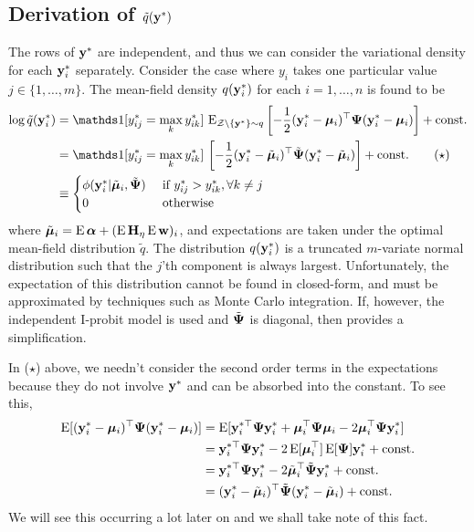 \subsection[Derivation of q ystar]{Derivation of $\tilde q({\mathbf y}^*)$}

The rows of ${\mathbf y}^*$ are independent, and thus we can consider the variational density for each ${\mathbf y}_i^*$ separately.
Consider the case where $y_i$ takes one particular value $j \in \{1,\dots,m\}$. The mean-field density $q({\mathbf y}_{i}^*)$ for each $i=1,\dots,n$ is found to be
\begin{align*}
  \log \tilde q(\by_{i}^*) 
  &=  \ind[y_{ij}^* = \max_k y_{ik}^*] \, \E_{\cZ\backslash\{\by^*\}\sim q} \left[ - \half (\by^*_i - \bmu_i)^\top \bPsi (\by^*_i - \bmu_i)  \right] + \const \\
  &= \ind[y_{ij}^* = \max_k y_{ik}^*] \, \left[ - \half (\by^*_i - \tilde\bmu_i)^\top \tilde\bPsi (\by^*_i - \tilde\bmu_i)  \right] + \const \tag{$\star$} \\
  &\equiv
  \begin{cases}
    \phi(\by_i^*|\tilde\bmu_i,\tilde\bPsi) & \text{ if } y_{ij}^* > y_{ik}^*, \forall k \neq j \\
    0 & \text{ otherwise} \\
  \end{cases}
\end{align*}
where $\tilde{{\bm\mu}}_i = \operatorname{E}{\bm\alpha} + (\operatorname{E}{\mathbf H}_\eta \operatorname{E}{\mathbf w})_i$, and expectations are taken under the optimal mean-field distribution $\tilde q$. 
The distribution $q({\mathbf y}_i^*)$ is a truncated $m$-variate normal distribution such that the $j$'th component is always largest. 
Unfortunately, the expectation of this distribution cannot be found in closed-form, and must be approximated by techniques such as Monte Carlo integration.
If, however, the independent I-probit model is used and $\tilde{{\bm\Psi}}$ is diagonal, then  provides a simplification.

\begin{remark}
  In ($\star$)  above,  we needn't consider the second order terms in the expectations because they do not involve ${\mathbf y}^*$ and can be absorbed into the constant.
  To see this,
  \begin{align*}
    \operatorname{E}[({\mathbf y}^*_i - {\bm\mu}_i)^\top{\bm\Psi}({\mathbf y}^*_i - {\bm\mu}_i)]
    &= \operatorname{E}[{\mathbf y}^{*\top}_i{\bm\Psi} {\mathbf y}^*_i + {\bm\mu}_i^\top{\bm\Psi}{\bm\mu}_i - 2{\bm\mu}_i^\top{\bm\Psi}{\mathbf y}^*_i] \\
    &= {\mathbf y}^{*\top}_i{\bm\Psi} {\mathbf y}^*_i - 2 \operatorname{E}[{\bm\mu}_i^\top] \operatorname{E}[{\bm\Psi}]{\mathbf y}^*_i + \text{const.}\hspace{0.01em} \\
    &= {\mathbf y}^{*\top}_i{\bm\Psi} {\mathbf y}^*_i - 2 \tilde{{\bm\mu}}_i^\top\tilde{{\bm\Psi}}{\mathbf y}^*_i + \text{const.}\hspace{0.01em} \\
    &= ({\mathbf y}^*_i - \tilde{{\bm\mu}}_i)^\top \tilde{{\bm\Psi}} ({\mathbf y}^*_i - \tilde{{\bm\mu}}_i) + \text{const.}\hspace{0.01em}
  \end{align*}
  We will see this occurring a lot later on and we shall take note of this fact.
\end{remark}


